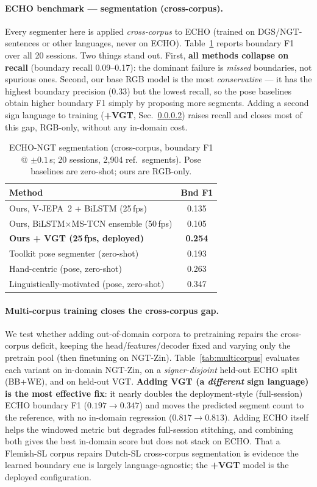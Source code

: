 \documentclass[10pt,twocolumn]{article}
\begin{document}
\paragraph{ECHO benchmark — segmentation (cross-corpus).} Every segmenter here is applied
\emph{cross-corpus} to ECHO (trained on DGS/NGT-sentences or other languages, never on ECHO).
Table~\ref{tab:seg-echo} reports boundary F1 over all 20 sessions. Two things stand out. First,
\textbf{all methods collapse on recall} (boundary recall 0.09--0.17): the dominant failure is
\emph{missed} boundaries, not spurious ones. Second, our base RGB model is the most
\emph{conservative} — it has the highest boundary precision (0.33) but the lowest recall, so the
pose baselines obtain higher boundary F1 simply by proposing more segments. Adding a second sign
language to training (\textbf{+VGT}, Sec.~\ref{sec:multicorpus}) raises recall and closes most of
this gap, RGB-only, without any in-domain cost.

\begin{table}[t]\centering\small
\caption{ECHO-NGT segmentation (cross-corpus, boundary F1 @ $\pm0.1$\,s; 20 sessions, 2{,}904 ref.\ segments). Pose baselines are zero-shot; ours are RGB-only.}
\label{tab:seg-echo}
\begin{tabular}{lc}\toprule
Method & Bnd F1\\\midrule
Ours, V-JEPA~2 + BiLSTM (25\,fps) & 0.135\\
Ours, BiLSTM$\times$MS-TCN ensemble (50\,fps) & 0.105\\
\textbf{Ours + VGT (25\,fps, deployed)} & \textbf{0.254}\\
\midrule
Toolkit pose segmenter (zero-shot) & 0.193\\
Hand-centric (pose, zero-shot)~\cite{handson} & 0.263\\
Linguistically-motivated (pose, zero-shot)~\cite{moryossef2023} & 0.347\\
\bottomrule
\end{tabular}
\end{table}

\paragraph{Multi-corpus training closes the cross-corpus gap.}\label{sec:multicorpus}
We test whether adding out-of-domain corpora to pretraining repairs the cross-corpus deficit,
keeping the head/features/decoder fixed and varying only the pretrain pool (then finetuning on
NGT-Zin). Table~\ref{tab:multicorpus} evaluates each variant on in-domain NGT-Zin, on a
\emph{signer-disjoint} held-out ECHO split (BB+WE), and on held-out VGT. \textbf{Adding VGT
(a \emph{different} sign language) is the most effective fix}: it nearly doubles the
deployment-style (full-session) ECHO boundary F1 ($0.197\!\to\!0.347$) and moves the predicted
segment count to the reference, with no in-domain regression ($0.817\!\to\!0.813$). Adding ECHO
itself helps the windowed metric but degrades full-session stitching, and combining both gives
the best in-domain score but does not stack on ECHO. That a Flemish-SL corpus repairs Dutch-SL
cross-corpus segmentation is evidence the learned boundary cue is largely language-agnostic; the
\textbf{+VGT} model is the deployed configuration.
\end{document}
